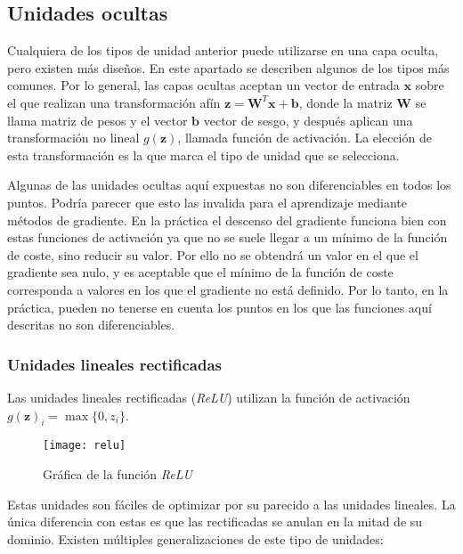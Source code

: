 \subsection{Unidades ocultas}\label{unidades-ocultas}

Cualquiera de los tipos de unidad anterior puede utilizarse en una capa oculta, pero existen más diseños. En este apartado se describen algunos de los tipos más comunes. Por lo general, las capas ocultas aceptan un vector de entrada $\textbf{x}$ sobre el que realizan una transformación afín $\textbf{z} = \textbf{W}^T\textbf{x} + \textbf{b}$, donde la matriz $\textbf{W}$ se llama matriz de pesos y el vector $\textbf{b}$ vector de sesgo, y después aplican una transformación no lineal $g(\textbf{z})$, llamada función de activación. La elección de esta transformación es la que marca el tipo de unidad que se selecciona.

Algunas de las unidades ocultas aquí expuestas no son diferenciables en todos los puntos. Podría parecer que esto las invalida para el aprendizaje mediante métodos de gradiente. En la práctica el descenso del gradiente funciona bien con estas funciones de activación ya que no se suele llegar a un mínimo de la función de coste, sino reducir su valor. Por ello no se obtendrá un valor en el que el gradiente sea nulo, y es aceptable que el mínimo de la función de coste corresponda a valores en los que el gradiente no está definido. Por lo tanto, en la práctica, pueden no tenerse en cuenta los puntos en los que las funciones aquí descritas no son diferenciables.

\subsubsection{Unidades lineales rectificadas}\label{unidades-relu}

Las unidades lineales rectificadas (\textit{ReLU}) utilizan la función de activación $g(\textbf{z})_i = \max\{0,z_i\}$.

\begin{figure}[htpb]
  \centering
  \texttt{[image: relu]}
  \caption{Gráfica de la función \textit{ReLU}}
  \label{fig:relu}
\end{figure}

Estas unidades son fáciles de optimizar por su parecido a las unidades lineales. La única diferencia con estas es que las rectificadas se anulan en la mitad de su dominio. Existen múltiples generalizaciones de este tipo de unidades:

